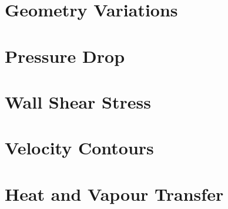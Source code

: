 \section{Geometry Variations}

\section{Pressure Drop}

\section{Wall Shear Stress}

\section{Velocity Contours}

\section{Heat and Vapour Transfer}
